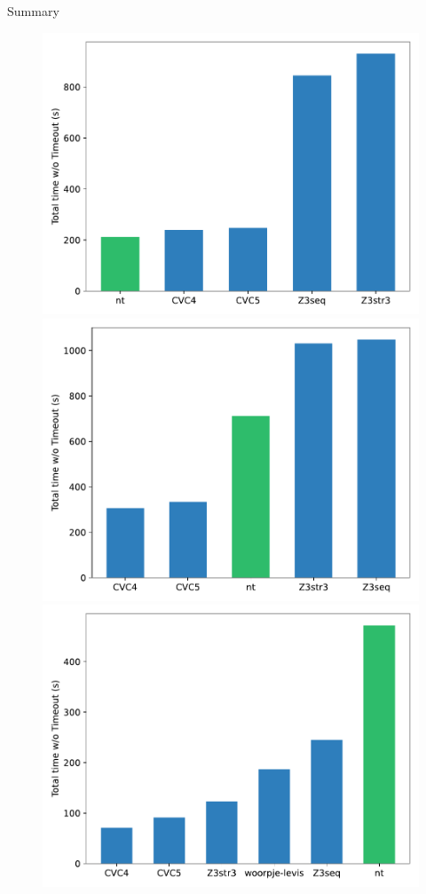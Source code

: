 \documentclass[xcolor=table]{beamer}
\begin{document}
\begin{frame}{Summary}

\begin{figure}[htp]

\centering
\includegraphics[width=.33\textwidth]{images/bar-1.pdf}\hfill
\includegraphics[width=.33\textwidth]{images/bar-2.pdf}\hfill
\includegraphics[width=.33\textwidth]{images/bar-2-without-1.pdf}

\end{figure}

\end{frame}
\end{document}
